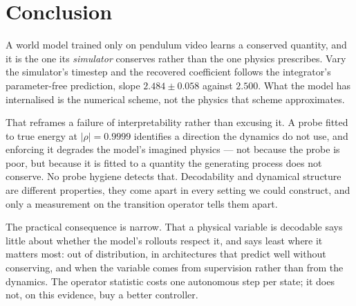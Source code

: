 \section{Conclusion}
\label{sec:conclusion}

A world model trained only on pendulum video learns a conserved quantity, and it is the one its
\emph{simulator} conserves rather than the one physics prescribes. Vary the simulator's timestep and
the recovered coefficient follows the integrator's parameter-free prediction, slope
$2.484 \pm 0.058$ against $2.500$. What the model has internalised is the numerical scheme, not the
physics that scheme approximates.

That reframes a failure of interpretability rather than excusing it. A probe fitted to true energy at
$|\rho| = 0.9999$ identifies a direction the dynamics do not use, and enforcing it degrades the
model's imagined physics --- not because the probe is poor, but because it is fitted to a quantity
the generating process does not conserve. No probe hygiene detects that. Decodability and dynamical
structure are different properties, they come apart in every setting we could construct, and only a
measurement on the transition operator tells them apart.

The practical consequence is narrow. That a physical variable is decodable says little about whether
the model's rollouts respect it, and says least where it matters most: out of distribution, in
architectures that predict well without conserving, and when the variable comes from supervision
rather than from the dynamics. The operator statistic costs one autonomous step per state; it does
not, on this evidence, buy a better controller.
